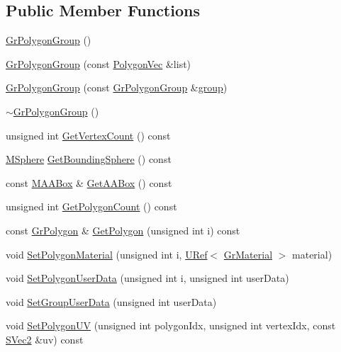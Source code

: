 \subsection*{Public Member Functions}
\begin{CompactItemize}
\item 
\hyperlink{class_gr_polygon_group_aa3b23b7e01fc2b036a5b9826f95948a}{GrPolygonGroup} ()
\item 
\hyperlink{class_gr_polygon_group_be9925f6b0511d2130e51891e6e685b5}{GrPolygonGroup} (const \hyperlink{class_gr_polygon_group_af5dedb77a4dc642d9fcca85710c3cf5}{PolygonVec} \&list)
\item 
\hyperlink{class_gr_polygon_group_b2c44b09732752e66e66bad26b06d65a}{GrPolygonGroup} (const \hyperlink{class_gr_polygon_group}{GrPolygonGroup} \&\hyperlink{wglext_8h_69cec9b28d037f2272131b4fcd148620}{group})
\item 
\hyperlink{class_gr_polygon_group_d8d202f8e381f757ce2f9591e84b3142}{$\sim$GrPolygonGroup} ()
\item 
unsigned int \hyperlink{class_gr_polygon_group_c8abcd749d8ba99fca070795ca770b2b}{GetVertexCount} () const 
\item 
\hyperlink{class_m_sphere}{MSphere} \hyperlink{class_gr_polygon_group_ebce104e3d59538c74e2701e98542afa}{GetBoundingSphere} () const 
\item 
const \hyperlink{class_m_a_a_box}{MAABox} \& \hyperlink{class_gr_polygon_group_f036e17871ac905b28a8e9c90da6d0e6}{GetAABox} () const 
\item 
unsigned int \hyperlink{class_gr_polygon_group_3e0a4ae8030ded12301495eed40135df}{GetPolygonCount} () const 
\item 
const \hyperlink{class_gr_polygon}{GrPolygon} \& \hyperlink{class_gr_polygon_group_267706848b196a4f1b7b0ebdeeb7188e}{GetPolygon} (unsigned int i) const 
\item 
void \hyperlink{class_gr_polygon_group_cc582187546be8c5c3d412c5980a9029}{SetPolygonMaterial} (unsigned int i, \hyperlink{class_u_ref}{URef}$<$ \hyperlink{class_gr_material}{GrMaterial} $>$ material)
\item 
void \hyperlink{class_gr_polygon_group_011cfe165e7b23f6b1a3710e63be95ec}{SetPolygonUserData} (unsigned int i, unsigned int userData)
\item 
void \hyperlink{class_gr_polygon_group_4385ad81ad1653c24b7a5a18018bb7a5}{SetGroupUserData} (unsigned int userData)
\item 
void \hyperlink{class_gr_polygon_group_33200fb9c4556c940a842f9504bd2a85}{SetPolygonUV} (unsigned int polygonIdx, unsigned int vertexIdx, const \hyperlink{struct_s_vec2}{SVec2} \&uv) const 

\end{CompactItemize}
